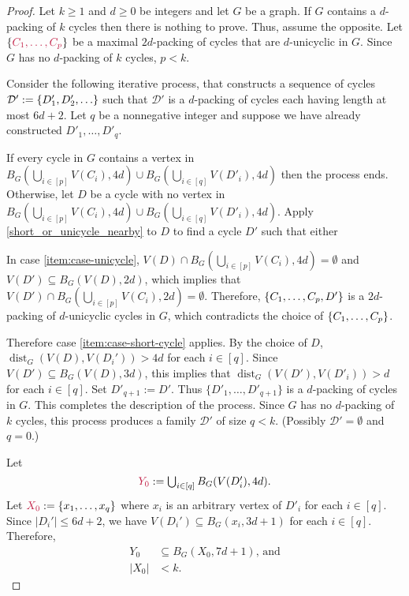 \documentclass{patmorin}
\DeclareMathOperator{\dist}{dist}
\DeclarePairedDelimiter\set{\{}{\}}
\begin{document}
\begin{proof}
  Let $k\ge 1$ and $d\ge 0$ be integers and let $G$ be a graph. If $G$ contains a $d$-packing of $k$ cycles then there is nothing to prove. Thus, assume the opposite. Let $\set{\mathdefin{C_1,\ldots,C_p}}$ be a maximal $2d$-packing of cycles that are $d$-unicyclic in $G$.  Since $G$ has no $d$-packing of $k$ cycles, $p<k$.

  Consider the following iterative process, that constructs a sequence of cycles $\mathcal{D}':=\set{D'_1,D'_2,\ldots}$ such that $\mathcal{D}'$ is a $d$-packing of cycles each having length at most $6d+2$. Let $q$ be a nonnegative integer and suppose we have already constructed $D'_1,\ldots,D'_{q}$.

  If every cycle in $G$ contains a vertex in  $B_G(\bigcup_{i\in[p]} V(C_i),4d)\cup B_G(\bigcup_{i\in[q]}V(D'_i),4d)$ then the process ends.  Otherwise, let $D$ be a cycle with no vertex in $B_G(\bigcup_{i\in[p]} V(C_i),4d)\cup B_G(\bigcup_{i\in[q]}V(D'_i),4d)$.   Apply \cref{short_or_unicycle_nearby} to $D$ to find a cycle $D'$ such that either
  In case \cref{item:case-unicycle}, $V(D)\cap B_G(\bigcup_{i\in[p]} V(C_i),4d)=\emptyset$ and $V(D')\subseteq B_G(V(D),2d)$, which implies that $V(D')\cap B_G(\bigcup_{i\in[p]} V(C_i),2d)=\emptyset$. Therefore, $\set{C_1,\ldots,C_p,D'}$ is a $2d$-packing of $d$-unicyclic cycles in $G$, which contradicts the choice of $\set{C_1,\ldots,C_p}$.

  Therefore case \cref{item:case-short-cycle} applies.  By the choice of $D$, $\dist_G(V(D),V(D_i'))>4d$ for each $i\in[q]$.  Since $V(D')\subseteq B_G(V(D),3d)$, this implies that $\dist_G(V(D'),V(D'_i))>d$ for each $i\in[q]$. Set $D'_{q+1}:=D'$. Thus $\{D'_1,\ldots,D'_{q+1}\}$ is a $d$-packing of cycles in $G$. This completes the description of the process. Since $G$ has no $d$-packing of $k$ cycles, this process produces a family $\mathcal{D'}$ of size $q<k$. (Possibly $\mathcal{D'}=\emptyset$ and $q=0$.)

  Let
  \[
      \textstyle\mathdefin{Y_0}:=\bigcup_{i\in[q]}B_G(V(D'_i),4d).
  \]
  Let $\mathdefin{X_0}:=\{x_1,\ldots,x_{q}\}$ where  $x_i$ is an arbitrary vertex of $D'_i$ for each $i\in[q]$. Since $|D_i'|\leq 6d+2$, we have $V(D_i')\subseteq B_G(x_i,3d+1)$ for each $i\in[q]$. Therefore,
  \begin{align}
    Y_0&\subseteq B_G(X_0,7d+1)\text{, and}\label{eq:M-contained-in-a-ball}\\
    |X_0|&< k.\label{eq:XM-size}
  \end{align}


\end{proof}
\end{document}
